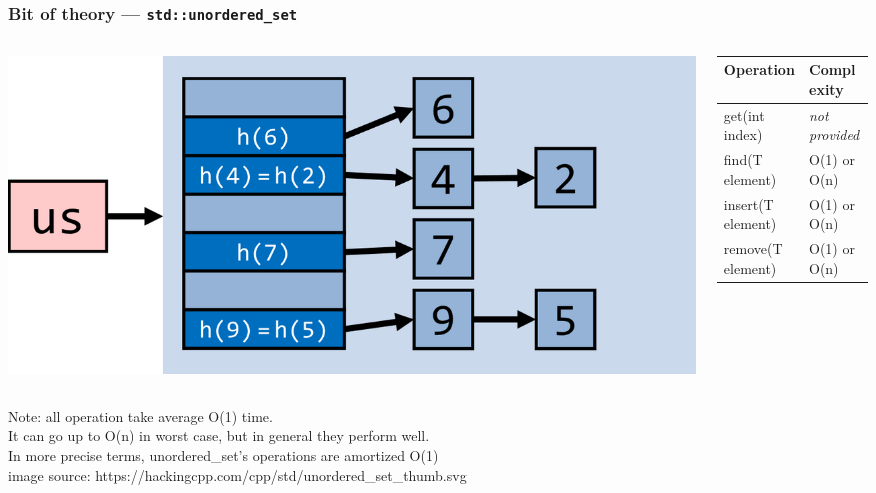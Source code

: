 \documentclass[aspectratio=169]{beamer}
\newcommand{\cpp}[1]{\texttt{\textbf{\textcolor{clCodeBlue}{#1}}}}
\newcommand\fontV{\fontsize{5}{5}\selectfont}
\newcommand\addsource[1]{\fontV\textcolor{clGray}{#1}}
\begin{document}
\begin{frame}
\frametitle{Bit of theory --- \cpp{std::unordered\_set}}
\begin{columns}
  \begin{column}{0.38\textwidth}
    \includegraphics[width=\textwidth]{pictures/unordered_set.png} \\
  \end{column}\hfill%
  \begin{column}{0.58\textwidth}
    \begin{tabular}{|l|l|}
      \hline
      Operation & Complexity \\
      \hline\hline
      get(int index) & \emph{not provided} \\
      \hline
      find(T element) & O(1) or O(n) \\
      \hline
      insert(T element) & O(1) or O(n) \\
      \hline
      remove(T element) & O(1) or O(n) \\
      \hline
    \end{tabular}\\
  \end{column}
\end{columns}
\vspace*{24pt}
{\hspace{1cm}Note: all operation take average \textcolor{clGreenFlag}{O(1) time}.\\}
{\hspace{1cm}It can go up to O(n) in worst case, but in general they perform well.\\}
{\hspace{1cm}In more precise terms, unordered\_set's operations are \textcolor{clViolet}{amortized O(1)}\\}
\vspace*{24pt}
\addsource{image source: https://hackingcpp.com/cpp/std/unordered\_set\_thumb.svg}
\end{frame}
\end{document}
